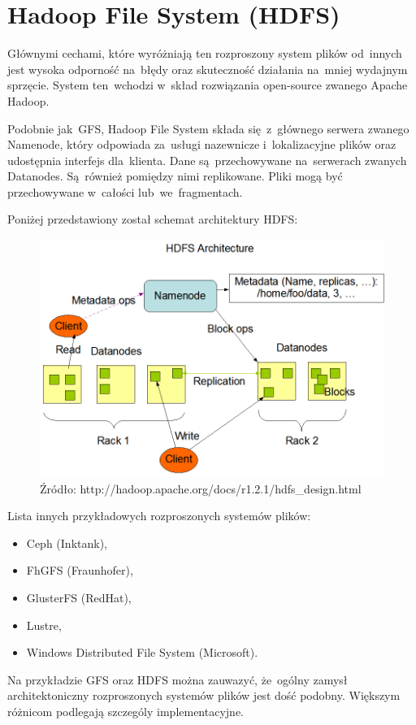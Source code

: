 \section[Hadoop File System (HDFS)][Hadoop File System (HDFS)]{Hadoop File
System (HDFS)}
Głównymi cechami, które wyróżniają ten rozproszony system plików od~innych jest
wysoka odporność na~błędy oraz skuteczność działania na~mniej wydajnym
sprzęcie. System ten~wchodzi w~skład rozwiązania open-source zwanego Apache Hadoop.

\vspace{5mm}
Podobnie jak~GFS, Hadoop File System składa się~z~głównego serwera zwanego
Namenode, który odpowiada za~usługi nazewnicze i~lokalizacyjne plików oraz
udostępnia interfejs dla~klienta. Dane są~przechowywane na~serwerach zwanych
Datanodes. Są~również pomiędzy nimi replikowane. Pliki mogą być przechowywane
w~całości lub~we~fragmentach.

\vspace{5mm}
Poniżej przedstawiony został schemat architektury HDFS:

\begin{figure}[H]
\center
\flushleft
\includegraphics[keepaspectratio=true, scale=0.45]{img/hdfs.png}
\caption{Źródło: http://hadoop.apache.org/docs/r1.2.1/hdfs\_design.html}
\label{fig:hdfs}
\end{figure}

Lista innych przykładowych rozproszonych systemów plików:
\begin{itemize}
  \item Ceph (Inktank),
  \item FhGFS (Fraunhofer),
  \item GlusterFS (RedHat),
  \item Lustre,
  \item Windows Distributed File System (Microsoft).
\end{itemize}

\vspace{5mm}
Na przykładzie GFS oraz HDFS można zauwazyć, że~ogólny zamysł architektoniczny
rozproszonych systemów plików jest dość podobny. Większym różnicom podlegają
szczególy implementacyjne.
